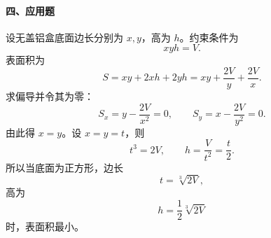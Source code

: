 \paragraph*{四、应用题}
设无盖铝盒底面边长分别为 $x,y$，高为 $h$。约束条件为
\[
  xyh=V.
\]
表面积为
\[
  S=xy+2xh+2yh=xy+\frac{2V}{y}+\frac{2V}{x}.
\]
求偏导并令其为零：
\[
  S_x=y-\frac{2V}{x^2}=0,\qquad
  S_y=x-\frac{2V}{y^2}=0.
\]
由此得 $x=y$。设 $x=y=t$，则
\[
  t^3=2V,\qquad h=\frac{V}{t^2}=\frac{t}{2}.
\]
所以当底面为正方形，边长
\[
  t=\sqrt[3]{2V},
\]
高为
\[
  h=\frac12\sqrt[3]{2V}
\]
时，表面积最小。
